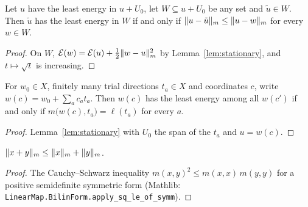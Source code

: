 \begin{lemma}\label{lem:cea}
  \leanok
  Let $u$ have the least energy in $u+U_0$, let $W\subseteq u+U_0$ be any set
  and $\tilde u\in W$.  Then $\tilde u$ has the least energy in $W$ if and only
  if $\lVert u-\tilde u\rVert_m\le\lVert u-w\rVert_m$ for every $w\in W$.
\end{lemma}

\begin{proof}
  \leanok
  On $W$, $\mathcal E(w)=\mathcal E(u)+\tfrac12\lVert w-u\rVert_m^2$ by
  Lemma~\ref{lem:stationary}, and $t\mapsto\sqrt t$ is increasing.
\end{proof}

\begin{lemma}\label{lem:galerkin}
  \leanok
  For $w_0\in X$, finitely many trial directions $t_a\in X$ and coordinates
  $c$, write $w(c)=w_0+\sum_ac_at_a$.  Then $w(c)$ has the least energy among
  all $w(c')$ if and only if $m\bigl(w(c),t_a\bigr)=\ell(t_a)$ for every $a$.
\end{lemma}

\begin{proof}
  \leanok
  Lemma~\ref{lem:stationary} with $U_0$ the span of the $t_a$ and $u=w(c)$.
\end{proof}

\begin{lemma}\label{lem:energy-triangle}
  \leanok
  $\lVert x+y\rVert_m\le\lVert x\rVert_m+\lVert y\rVert_m$.
\end{lemma}

\begin{proof}
  \leanok
  The Cauchy--Schwarz inequality $m(x,y)^2\le m(x,x)\,m(y,y)$ for a positive
  semidefinite symmetric form (Mathlib:
  \texttt{LinearMap.BilinForm.apply\_sq\_le\_of\_symm}).
\end{proof}

